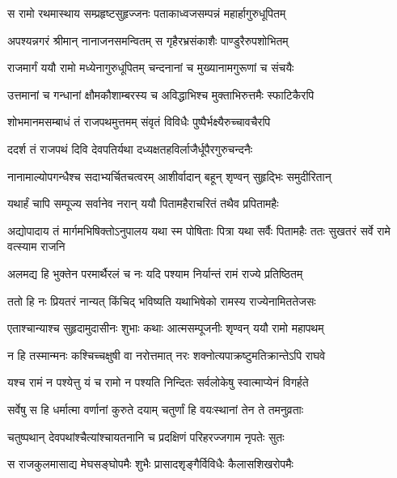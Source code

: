 
\twolineshloka
{स रामो रथमास्थाय सम्प्रहृष्टसुहृज्जनः}
{पताकाध्वजसम्पन्नं महार्हागुरुधूपितम्} %

\twolineshloka
{अपश्यन्नगरं श्रीमान् नानाजनसमन्वितम्}
{स गृहैरभ्रसंकाशैः पाण्डुरैरुपशोभितम्} %

\twolineshloka
{राजमार्गं ययौ रामो मध्येनागुरुधूपितम्}
{चन्दनानां च मुख्यानामगुरूणां च संचयैः} %

\twolineshloka
{उत्तमानां च गन्धानां क्षौमकौशाम्बरस्य च}
{अविद्धाभिश्च मुक्ताभिरुत्तमैः स्फाटिकैरपि} %

\twolineshloka
{शोभमानमसम्बाधं तं राजपथमुत्तमम्}
{संवृतं विविधैः पुष्पैर्भक्ष्यैरुच्चावचैरपि} %

\twolineshloka
{ददर्श तं राजपथं दिवि देवपतिर्यथा}
{दध्यक्षतहविर्लाजैर्धूपैरगुरुचन्दनैः} %

\twolineshloka
{नानामाल्योपगन्धैश्च सदाभ्यर्चितचत्वरम्}
{आशीर्वादान् बहून् शृण्वन् सुहृद्भिः समुदीरितान्} %

\twolineshloka
{यथार्हं चापि सम्पूज्य सर्वानेव नरान् ययौ}
{पितामहैराचरितं तथैव प्रपितामहैः} %

\threelineshloka
{अद्योपादाय तं मार्गमभिषिक्तोऽनुपालय}
{यथा स्म पोषिताः पित्रा यथा सर्वैः पितामहैः}
{ततः सुखतरं सर्वे रामे वत्स्याम राजनि} %

\twolineshloka
{अलमद्य हि भुक्तेन परमार्थैरलं च नः}
{यदि पश्याम निर्यान्तं रामं राज्ये प्रतिष्ठितम्} %

\twolineshloka
{ततो हि नः प्रियतरं नान्यत् किंचिद् भविष्यति}
{यथाभिषेको रामस्य राज्येनामिततेजसः} %

\twolineshloka
{एताश्चान्याश्च सुहृदामुदासीनः शुभाः कथाः}
{आत्मसम्पूजनीः शृण्वन् ययौ रामो महापथम्} %

\twolineshloka
{न हि तस्मान्मनः कश्चिच्चक्षुषी वा नरोत्तमात्}
{नरः शक्नोत्यपाक्रष्टुमतिक्रान्तेऽपि राघवे} %

\twolineshloka
{यश्च रामं न पश्येत्तु यं च रामो न पश्यति}
{निन्दितः सर्वलोकेषु स्वात्माप्येनं विगर्हते} %

\twolineshloka
{सर्वेषु स हि धर्मात्मा वर्णानां कुरुते दयाम्}
{चतुर्णां हि वयःस्थानां तेन ते तमनुव्रताः} %

\twolineshloka
{चतुष्पथान् देवपथांश्चैत्यांश्चायतनानि च}
{प्रदक्षिणं परिहरज्जगाम नृपतेः सुतः} %

\twolineshloka
{स राजकुलमासाद्य मेघसङ्घोपमैः शुभैः}
{प्रासादशृङ्गैर्विविधैः कैलासशिखरोपमैः} %

